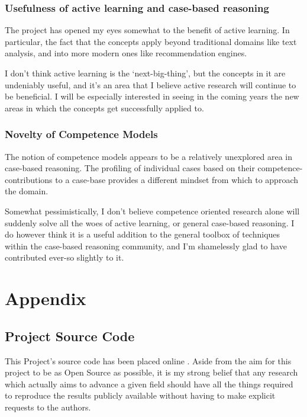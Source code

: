 \documentclass[a4paper,11pt]{report}
\begin{document}
\subsection{Usefulness of active learning and case-based reasoning}

The project has opened my eyes somewhat to the benefit of active learning. In particular, the fact that the concepts apply beyond traditional domains like text analysis, and into more modern ones like recommendation engines.

I don't think active learning is the `next-big-thing', but the concepts in it are undeniably useful, and it's an area that I believe active research  will continue to be beneficial. I will be especially interested in seeing in the coming years the new areas in which the concepts get successfully applied to.

\subsection{Novelty of Competence Models}

The notion of competence models appears to be a relatively unexplored area in case-based reasoning. The profiling of individual cases based on their competence-contributions to a case-base provides a different mindset from which to approach the domain.

Somewhat pessimistically, I don't believe competence oriented research alone will suddenly solve all the woes of active learning, or general case-based reasoning. I do however think it is a useful addition to the general toolbox of techniques within the case-based reasoning community, and I'm shamelessly glad to have contributed ever-so slightly to it.

\chapter{Appendix}
\section{Project Source Code}
This Project's source code has been placed online \citep{web:projectsourcecode}. Aside from the aim for this project to be as Open Source as possible, it is my strong belief that any research which actually aims to advance a given field should have all the things required to reproduce the results publicly available without having to make explicit requests to the authors. 
\end{document}
